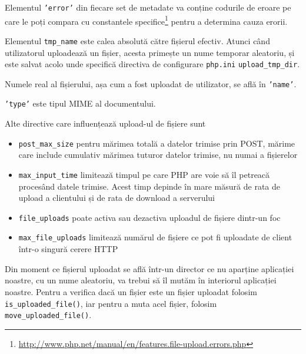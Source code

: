 Elementul \texttt{'error'} din fiecare set de metadate va conține
codurile de eroare pe care le poți compara
cu constantele specifice\footnote{\url{http://www.php.net/manual/en/features.file-upload.errors.php}}
pentru a determina cauza erorii.


Elementul \texttt{tmp\_name} este calea absolută către fișierul efectiv.
Atunci când utilizatorul uploadează un fișier, acesta primește un nume
temporar aleatoriu, și este salvat acolo unde specifică
directiva de configurare \texttt{php.ini} \texttt{upload\_tmp\_dir}.

Numele real al fișierului, așa cum a fost uploadat de utilizator,
se află în \texttt{'name'}.

\texttt{'type'} este tipul MIME al documentului.

Alte directive care influențează upload-ul de fișiere sunt
\begin{itemize}
\item \texttt{post\_max\_size} pentru mărimea totală a datelor trimise prin POST, mărime care include
	  cumulativ mărimea tuturor datelor trimise, nu numai a fișierelor
\item \texttt{max\_input\_time} limitează timpul pe care PHP are voie să îl petreacă
  procesând datele trimise. Acest timp depinde în mare măsură de rata de upload
  a clientului și de rata de download a serverului
\item \texttt{file\_uploads} poate activa sau dezactiva uploadul de fișiere dintr-un foc
\item \texttt{max\_file\_uploads} limitează numărul de fișiere ce pot fi uploadate de
  client într-o singură cerere HTTP
\end{itemize}

Din moment ce fișierul uploadat se află într-un director ce nu aparține
aplicației noastre, cu un nume aleatoriu, va trebui să
îl mutăm în interiorul aplicației noastre. Pentru
a verifica dacă un fișier este un fișier uploadat folosim
\texttt{is\_uploaded\_file()}, iar pentru a muta
acel fișier, folosim \texttt{move\_uploaded\_file()}.



